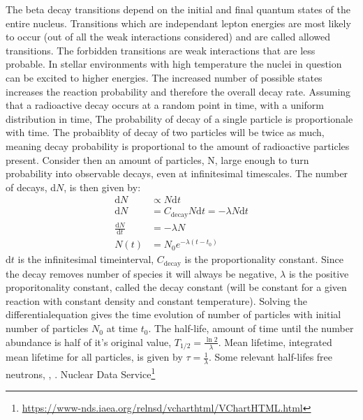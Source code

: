 The beta decay transitions depend on the initial and final quantum states of the entire nucleus.
Transitions which are independant lepton energies are most likely to occur (out of all the weak interactions considered)
and are called allowed transitions.
The forbidden transitions are weak interactions that are less probable.
In stellar environments with high temperature the nuclei in question can be excited to higher energies.
The increased number of possible states increases the reaction probability and therefore the overall decay rate.
Assuming that a radioactive decay occurs at a random point in time, with a uniform distribution in time,
The probability of decay of a single particle is proportionale with time.
The probaiblity of decay of two particles will be twice as much, meaning decay probability is
proportional to the amount of radioactive particles present.
Consider then an amount of particles, N,  large enough to turn probability into observable decays,
even at infinitesimal timescales. The number of decays, d$N$, is then given by:
\begin{align*}
  \textrm{d}N &\propto N \textrm{d}t \\
  \textrm{d}N &= C_{\textrm{decay}} N \textrm{d}t = -\lambda N \textrm{d}t\\
  \frac{\textrm{d}N}{\textrm{d}t} &= -\lambda N \\
  N(t) &= N_0 e^{-\lambda (t - t_0)}
\end{align*}
d$t$ is the infinitesimal timeinterval, $C_{\textrm{decay}}$ is the proportionality constant. Since the decay removes number of species it will always be negative, $\lambda$ is the positive proporitonality constant, called the decay constant (will be constant for a given reaction with constant density and constant temperature). Solving the differentialequation gives the time evolution of number of particles with initial number of particles $N_0$ at time $t_0$.
The half-life, amount of time until the number abundance is half of it's original value, $T_{1/2} = \frac{\ln 2}{\lambda}$.
Mean lifetime, integrated mean lifetime for all particles, is given by $\tau = \frac{1}{\lambda}$.
Some relevant half-lifes free neutrons, , .
Nuclear Data Service\footnote{\url{https://www-nds.iaea.org/relnsd/vcharthtml/VChartHTML.html}}
